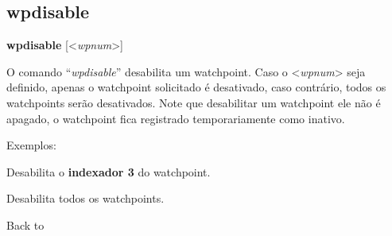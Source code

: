 \documentclass[letterpaper,10pt,brazil]{sphinxmanual}
\begin{document}
\subsection{wpdisable}
\label{debugger/watchpoint:wpdisable}\label{debugger/watchpoint:debugger-command-wpdisable}
\begin{DUlineblock}{0em}
\item[]
\begin{DUlineblock}{\DUlineblockindent}
\item[] \textbf{wpdisable} {[}\textless{}\emph{wpnum}\textgreater{}{]}
\item[] 
\end{DUlineblock}
\item[] O comando ``\emph{wpdisable}'' desabilita um watchpoint. Caso o \textless{}\emph{wpnum}\textgreater{} seja definido, apenas o watchpoint solicitado é desativado, caso contrário, todos os watchpoints serão desativados. Note que desabilitar um watchpoint ele não é apagado, o watchpoint fica registrado temporariamente como inativo.
\item[] 
\item[] Exemplos:
\item[] 
\item[]
\begin{DUlineblock}{\DUlineblockindent}
\item[] 
\item[] 
\end{DUlineblock}
\item[] Desabilita o \textbf{indexador 3} do watchpoint.
\item[] 
\item[]
\begin{DUlineblock}{\DUlineblockindent}
\item[] 
\item[] 
\end{DUlineblock}
\item[] Desabilita todos os watchpoints.
\item[] 
\item[] Back to {\hyperref[debugger/watchpoint:debugger\string-watchpoints\string-list]{}}
\end{DUlineblock}
\begin{quote}
\label{debugger/watchpoint:debugger-command-wpenable}\end{quote}
\end{document}
